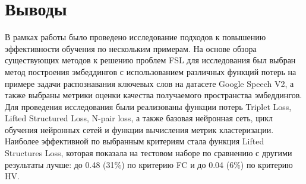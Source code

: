 \section{Выводы}
\label{sec:Chapter6} 

\par
В рамках работы было проведено исследование подходов к повышению эффективности обучения по нескольким примерам.
На основе обзора существующих методов к решению проблем FSL для исследования был выбран метод построения эмбеддингов с использованием различных функций потерь на примере задачи распознавания ключевых слов на датасете Google Speech V2, а также выбраны метрики оценки качества получаемого пространства эмбеддингов. Для проведения исследования были реализованы функции потерь Triplet Loss, Lifted Structured Loss, N-pair loss, а также базовая нейронная сеть, цикл обучения нейронных сетей и функции вычисления метрик кластеризации. Наиболее эффективной по выбранным критериям стала функция Lifted Structures Loss, которая показала на тестовом наборе по сравнению с другими результаты лучше: до 0.48 (31\%) по критерию FC и  до 0.04 (6\%) по критерию HV.